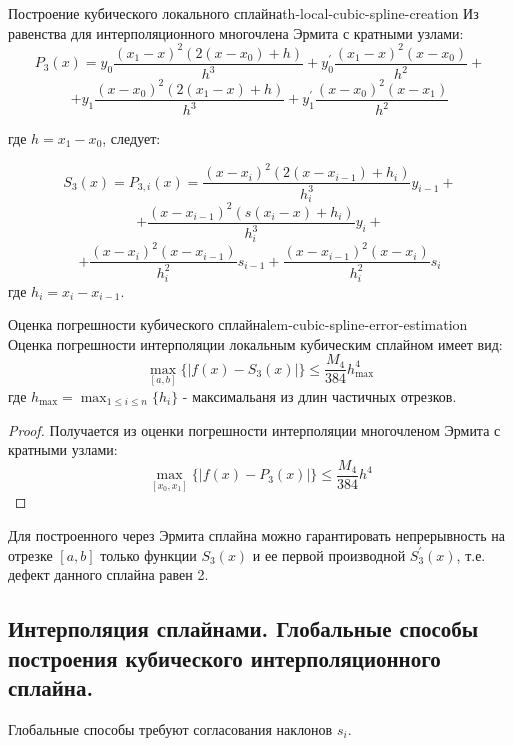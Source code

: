 \documentclass[14pt]{extarticle}
\begin{document}
    \begin{theorem}{Построение кубического локального сплайна}{th-local-cubic-spline-creation}
        Из равенства для интерполяционного многочлена Эрмита с кратными узлами:
        $$P_{3}(x) = y_{0}\frac{(x_{1} - x)^{2} (2(x - x_{0}) + h)}{h^{3}} + y_{0}^{'}\frac{(x_{1} - x)^{2}(x-x_{0})}{h^{2}} +$$ 
        $$+ y_{1}\frac{(x - x_{0})^{2}(2(x_{1} - x) + h)}{h^{3}} + y_{1}^{'}\frac{(x - x_{0})^{2}(x - x_{1})}{h^{2}}$$
        
        где $h = x_{1} - x_{0}$, следует:
        
        $$S_{3}(x) = P_{3, i}(x) = \frac{(x - x_{i})^{2}(2(x - x_{i-1})+h_{i})}{h_{i}^{3}}y_{i - 1} +$$ 
        $$+ \frac{(x - x_{i - 1})^{2}(s(x_{i} - x) + h_{i})}{h_{i}^{3}}y_{i} +$$ 
        $$+ \frac{(x - x_{i})^{2}(x - x_{i - 1})}{h_{i}^{2}}s_{i - 1} + \frac{(x- x_{i - 1})^{2}(x - x_{i})}{h_{i}^{2}} s_{i}$$
        где $h_{i} = x_{i} - x_{i - 1}$.
    \end{theorem}

    \begin{lemma}{Оценка погрешности кубического сплайна}{lem-cubic-spline-error-estimation}
        Оценка погрешности интерполяции локальным кубическим сплайном имеет вид:
        $$\max_{[a, b]}\{|f(x) - S_{3}(x)|\} \leq \frac{M_{4}}{384}h_{\max}^{4}$$
        где $h_{\max} = \max_{1 \leq i \leq n}\{h_{i}\}$ - максимальаня из длин частичных отрезков.

        \begin{proof}
            Получается из оценки погрешности интерполяции многочленом Эрмита с кратными узлами:
            $$\max_{[x_{0}, x_{1}]}\{|f(x) - P_{3}(x)|\} \leq \frac{M_{4}}{384} h^{4}$$
        \end{proof}
    \end{lemma}

    Для построенного через Эрмита сплайна можно гарантировать непрерывность на отрезке $[a, b]$ только функции $S_{3}(x)$ и ее первой производной $S_{3}^{'}(x)$, т.е. дефект данного сплайна равен 2.

\clearpage
\subsection{Интерполяция сплайнами. Глобальные способы построения кубического интерполяционного сплайна.}

    Глобальные способы требуют согласования наклонов $s_{i}$.
\end{document}
